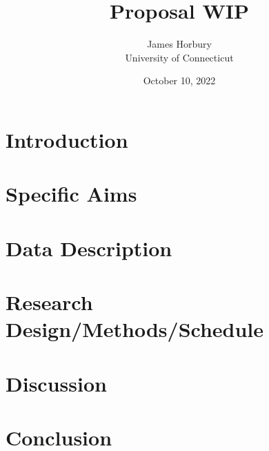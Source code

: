 \documentclass[12pt]{article}
\title{Proposal WIP}
\author{James Horbury\\
    University of Connecticut
}
\date{October 10, 2022}
\begin{document}
\maketitle

\section*{Introduction}
\label{sec:intro}

\section*{Specific Aims}
\label{sec:spec}

\section*{Data Description}
\label{sec:data}

\section*{Research Design/Methods/Schedule}
\label{sec:res}

\section*{Discussion}
\label{sec:disc}

\section*{Conclusion}
\label{sec:conc}



\end{document}
